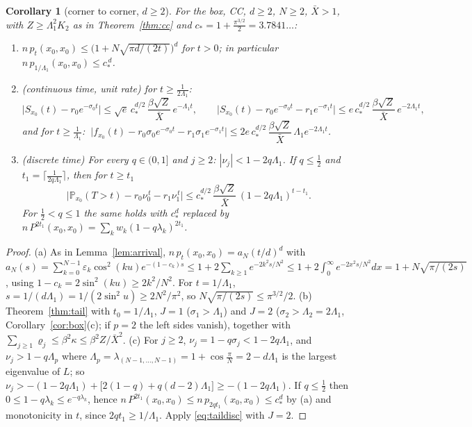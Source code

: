 \documentclass[11pt,a4paper]{article}
\newcommand{\PP}{\mathbb P}
\newcommand{\Xb}{\bar X}
\theoremstyle{plain}
\newtheorem{corollary}[theorem]{Corollary}
\theoremstyle{definition}
\numberwithin{equation}{section}
\begin{document}
\begin{corollary}[corner to corner, $d\ge2$]\label{cor:tailcc}
For the box, CC, $d\ge2$, $N\ge2$, $\Xb>1$, with $Z\ge\Lambda_1^2K_2$ as in Theorem~\ref{thm:cc} and $c_*=1+\frac{\pi^{3/2}}{2}=3.7841\ldots$:
\begin{enumerate}
\item[(a)] $n\,p_t(x_0,x_0)\le\big(1+N\sqrt{\pi d/(2t)}\big)^d$ for $t>0$; in particular $n\,p_{1/\Lambda_1}(x_0,x_0)\le c_*^{\,d}$.
\item[(b)] (continuous time, unit rate) for $t\ge\frac{1}{2\Lambda_1}$:
\[
\big|S_{x_0}(t)-r_0e^{-\sigma_0t}\big|\le\sqrt e\,c_*^{d/2}\,\frac{\beta\sqrt Z}{\Xb}\,e^{-\Lambda_1t},\qquad
\big|S_{x_0}(t)-r_0e^{-\sigma_0t}-r_1e^{-\sigma_1t}\big|\le e\,c_*^{d/2}\,\frac{\beta\sqrt Z}{\Xb}\,e^{-2\Lambda_1t},
\]
and for $t\ge\frac1{\Lambda_1}$: $\ \big|f_{x_0}(t)-r_0\sigma_0e^{-\sigma_0t}-r_1\sigma_1e^{-\sigma_1t}\big|\le2e\,c_*^{d/2}\,\dfrac{\beta\sqrt Z}{\Xb}\,\Lambda_1e^{-2\Lambda_1t}$.
\item[(c)] (discrete time) For every $q\in(0,1]$ and $j\ge2$: $|\nu_j|<1-2q\Lambda_1$. If $q\le\frac12$ and $t_1=\lceil\frac{1}{2q\Lambda_1}\rceil$, then for $t\ge t_1$
\[
\Big|\PP_{x_0}(T>t)-r_0\nu_0^{\,t}-r_1\nu_1^{\,t}\Big|\le c_*^{d/2}\,\frac{\beta\sqrt Z}{\Xb}\,(1-2q\Lambda_1)^{t-t_1}.
\]
For $\frac12<q\le1$ the same holds with $c_*^{d}$ replaced by $n\,P^{2t_1}(x_0,x_0)=\sum_kw_k(1-q\lambda_k)^{2t_1}$.
\end{enumerate}
\end{corollary}
\begin{proof}
(a) As in Lemma~\ref{lem:arrival}, $n\,p_t(x_0,x_0)=a_N(t/d)^d$ with $a_N(s)=\sum_{k=0}^{N-1}\varepsilon_k\cos^2(ku)e^{-(1-c_k)s}\le1+2\sum_{k\ge1}e^{-2k^2s/N^2}\le1+2\int_0^\infty e^{-2x^2s/N^2}dx=1+N\sqrt{\pi/(2s)}$, using $1-c_k=2\sin^2(ku)\ge2k^2/N^2$. For $t=1/\Lambda_1$, $s=1/(d\Lambda_1)=1/(2\sin^2u)\ge2N^2/\pi^2$, so $N\sqrt{\pi/(2s)}\le\pi^{3/2}/2$.
(b) Theorem~\ref{thm:tail} with $t_0=1/\Lambda_1$, $J=1$ ($\sigma_1>\Lambda_1$) and $J=2$ ($\sigma_2>\Lambda_2=2\Lambda_1$, Corollary~\ref{cor:box}(c); if $p=2$ the left sides vanish), together with $\sum_{j\ge1}\varrho_j\le\beta^2\kappa\le\beta^2Z/\Xb^2$.
(c) For $j\ge2$, $\nu_j=1-q\sigma_j<1-2q\Lambda_1$, and $\nu_j>1-q\Lambda_p$ where $\Lambda_p=\lambda_{(N-1,\dots,N-1)}=1+\cos\frac\pi N=2-d\Lambda_1$ is the largest eigenvalue of $L$; so $\nu_j>-(1-2q\Lambda_1)+\big[2(1-q)+q(d-2)\Lambda_1\big]\ge-(1-2q\Lambda_1)$. If $q\le\frac12$ then $0\le1-q\lambda_k\le e^{-q\lambda_k}$, hence $n\,P^{2t_1}(x_0,x_0)\le n\,p_{2qt_1}(x_0,x_0)\le c_*^d$ by (a) and monotonicity in $t$, since $2qt_1\ge1/\Lambda_1$. Apply \eqref{eq:taildisc} with $J=2$.
\end{proof}
\end{document}
